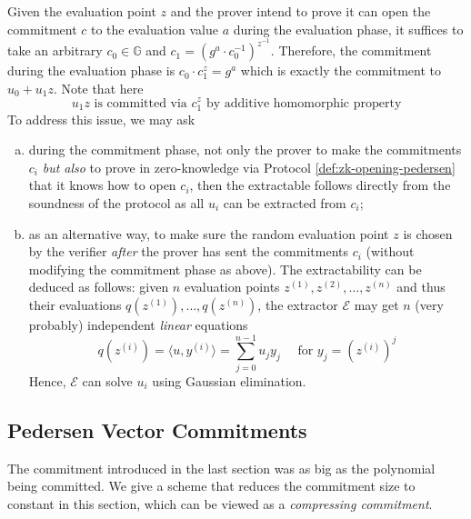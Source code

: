 \documentclass{article}
\begin{document}
Given the evaluation point $z$ and the prover intend to prove it can open the commitment $c$ to the evaluation value $a$ during the evaluation phase, it suffices to take an arbitrary $c_0 \in \mathbb{G}$ and $c_1 = (g^a \cdot c_0^{-1})^{z^{-1}}$. Therefore, the commitment during the evaluation phase is $c_0 \cdot c_1^z = g^a$ which is exactly the commitment to $u_0 + u_1z$. Note that here 
\begin{equation*}
u_1z \text{ is committed via } c_1^z \text{ by additive homomorphic property}
\end{equation*}
To address this issue, we may ask
\begin{enumerate}[(a)]
\item\label{item:82} during the commitment phase, not only the prover to make the commitments $c_i$ \textit{but also} to prove in zero-knowledge via Protocol \ref{def:zk-opening-pedersen} that it knows how to open $c_i$, then the extractable follows directly from the soundness of the protocol as all $u_i$ can be extracted from $c_i$; 
\item\label{item:83} as an alternative way, to make sure the random evaluation point $z$ is chosen by the verifier \textit{after} the prover has sent the commitments $c_i$ (without modifying the commitment phase as above). The extractability can be deduced as follows: given $n$ evaluation points $z^{(1)}, z^{(2)}, \dots, z^{(n)}$ and thus their evaluations $q(z^{(1)}), \dots, q(z^{(n)})$, the extractor $\mathcal{E}$ may get $n$ (very probably) independent \textit{linear} equations
\begin{equation*}
q(z^{(i)}) = \langle u, y^{(i)} \rangle = \sum_{j = 0}^{n-1} u_{j} y_{j} \quad \text{ for } y_j = (z^{(i)})^{j}
\end{equation*}
Hence, $\mathcal{E}$ can solve $u_i$ using Gaussian elimination. 
\end{enumerate}

\subsection{Pedersen Vector Commitments} \label{sec:peders-vect-comm}
The commitment introduced in the last section was as big as the polynomial being committed. We give a scheme that reduces the commitment size to constant in this section, which can be viewed as a \textit{compressing commitment}. 
\end{document}
